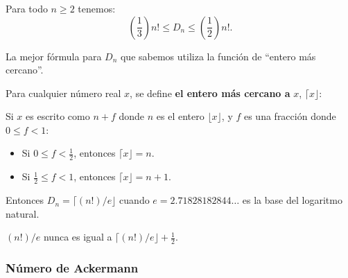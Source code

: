 \begin{frame}
\frametitle{\subsecname}

\begin{theorem}
Para todo $n\geq2$ tenemos: \[ \left(\frac{1}{3}\right)n!\leq D_{n}\leq\left(\frac{1}{2}\right)n!. \]
\end{theorem}

La mejor fórmula para $D_{n}$ que sabemos utiliza la función de ``entero más cercano''.

\begin{definition}
	Para cualquier número real $x$, se define \textbf{el entero más cercano a} $x$, $\lceil x\rfloor$:

	Si $x$ es escrito como $n+f$ donde $n$ es el entero $\lfloor x\rfloor$, y $f$ es una fracción donde $0\leq f<1$:

	\begin{itemize}
		\item Si $0\leq f<\frac{1}{2}$, entonces $\lceil x\rfloor=n$.
		\item Si $\frac{1}{2}\leq f<1$, entonces $\lceil x\rfloor=n+1$.
	\end{itemize}
\end{definition}

\begin{remark}
	Entonces $D_{n}=\lceil(n!)/e\rfloor$ cuando $e=2.71828182844\ldots$ es la base del logaritmo natural.

	$(n!)/e$  nunca es igual a $\lceil(n!)/e\rfloor+\frac{1}{2}$.
\end{remark}
\end{frame}

\subsubsection{Número de Ackermann}

